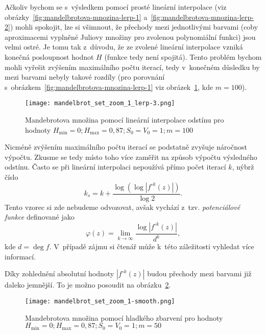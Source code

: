 Ačkoliv bychom se s~výsledkem pomocí prosté lineární interpolace (viz obrázky~\ref{fig:mandelbrotova-mnozina-lerp-1} a~\ref{fig:mandelbrotova-mnozina-lerp-2}) mohli spokojit, lze si všimnout, že přechody mezi jednotlivými barvami (coby aproximacemi vyplněné Juliovy množiny pro zvolenou polynomiální funkci) jsou velmi ostré. Je tomu tak z~důvodu, že ze zvolené lineární interpolace vzniká konečná posloupnost hodnot $H$ (funkce tedy není spojitá). Tento problém bychom mohli vyřešit zvýšením maximálního počtu iterací, tedy v~konečném důsledku by mezi barvami nebyly takové rozdíly (pro porovnání s~obrázkem~\ref{fig:mandelbrotova-mnozina-lerp-1} viz obrázek~\ref{fig:mandelbrotova-mnozina-lerp-3}, kde $m=100$).
\begin{figure}[h]
    \centering
    \texttt{[image: mandelbrot\_set\_zoom\_1\_lerp-3.png]}
    \caption{Mandebrotova množina pomocí lineární interpolace odstínu pro hodnoty $H_{\text{min}}=0;H_{\text{max}}=0{,}87;S_0=V_0=1;m=100$}
    \label{fig:mandelbrotova-mnozina-lerp-3}
\end{figure}
Nicméně zvýšením maximálního počtu iterací se podstatně zvyšuje náročnost výpočtu. Zkusme se tedy místo toho více zaměřit na způsob výpočtu výsledného odstínu. Často se při lineární interpolaci nepoužívá přímo počet iterací $k$, nýbrž číslo
\[k_s=k+\dfrac{\log(\log|f^{\circ k}(z)|)}{\log{2}}.\]
Tento vzorec si zde nebudeme odvozovat, avšak vychází z~tzv. \emph{potenciálové funkce} definované jako
\[\varphi(z)=\lim_{k\to \infty }{\frac {\log|f^{\circ k}(z)|}{d^{k}}},\]
kde $d=\deg{f}$. V~případě zájmu si čtenář může k~této záležitosti vyhledat více informací.

Díky zohlednění absolutní hodnoty $|f^{\circ k}(z)|$ budou přechody mezi barvami již daleko jemnější. To je možno posoudit na obrázku~\ref{fig:mandelbrotova-mnozina-smooth}.
\begin{figure}[h]
    \centering
    \texttt{[image: mandelbrot\_set\_zoom\_1-smooth.png]}
    \caption{Mandebrotova množina pomocí hladkého zbarvení pro hodnoty $H_{\text{min}}=0;H_{\text{max}}=0{,}87;S_0=V_0=1;m=50$}
    \label{fig:mandelbrotova-mnozina-smooth}
\end{figure}